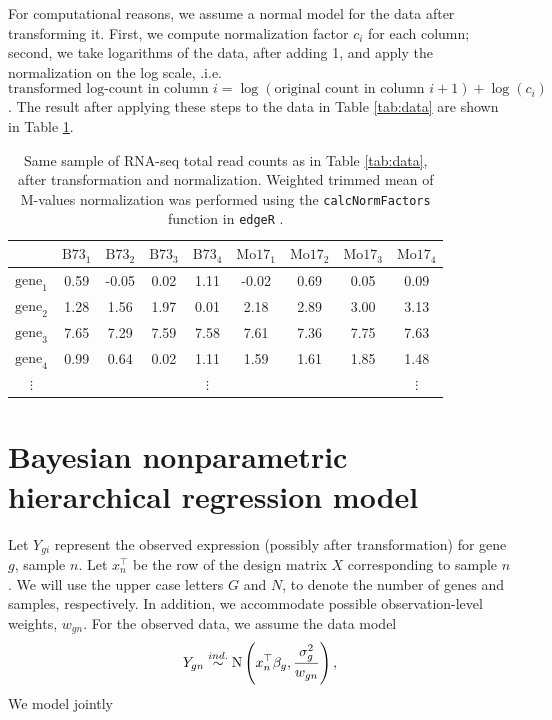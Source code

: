 For computational reasons, we assume a normal model for the data after transforming it. First, we compute normalization factor $c_i$ for each column; second, we take logarithms of the data, after adding 1, and apply the normalization on the log scale, .i.e.
$$\mbox{transformed log-count in column }i = \log (\mbox{original count in column }i+1) + \log(c_i)$$. The result after applying these steps to the data in Table \ref{tab:data} are shown in Table \ref{tab:data-transformed}.

\begin{table}[ht]
\centering
\caption{\small Same sample of RNA-seq total read counts as in Table \ref{tab:data}, after transformation and normalization. Weighted trimmed mean of M-values normalization was performed using the \texttt{calcNormFactors} function in \texttt{edgeR} \cite{edger2010}.}
\label{tab:data-transformed}
\vspace{.2in}
\begin{tabular}{ccccccccc}
  \hline
 & $\mbox{B73}_1$ & $\mbox{B73}_2$ & $\mbox{B73}_3$ & $\mbox{B73}_4$ & $\mbox{Mo17}_1$ & $\mbox{Mo17}_2$ & $\mbox{Mo17}_3$ & $\mbox{Mo17}_4$ \\ 
  \hline
$\mbox{gene}_1$ & 0.59 & -0.05 & 0.02 & 1.11 & -0.02 & 0.69 & 0.05 & 0.09 \\ 
$\mbox{gene}_2$ & 1.28 & 1.56 & 1.97 & 0.01 & 2.18 & 2.89 & 3.00 & 3.13 \\ 
$\mbox{gene}_3$ & 7.65 & 7.29 & 7.59 & 7.58 & 7.61 & 7.36 & 7.75 & 7.63 \\ 
$\mbox{gene}_4$ & 0.99 & 0.64 & 0.02 & 1.11 & 1.59 & 1.61 & 1.85 & 1.48 \\ 
$\vdots$ &  &  &  & $\vdots$ &  & &  & $\vdots$ \\ 
   \hline
\end{tabular}
\end{table}

\section{Bayesian nonparametric hierarchical regression model}
\label{sec:model}
Let $Y_{gi}$ represent the observed expression (possibly after transformation) for gene $g$, sample $n$. Let $x_{n}^\top$ be the row of the design matrix $X$ corresponding to sample $n$. We will use the upper case letters $G$ and $N$, to denote the number of genes and samples, respectively. In addition, we accommodate possible observation-level weights, $w_{gn}$. For the observed data, we assume the data model
\begin{equation*}
Y_{gn} \stackrel{ind.}{\sim} \operatorname{N} \left( x_{n}^\top \beta_g, \frac{\sigma^2_g}{w_{gn}} \right),
\end{equation*}
We model jointly

